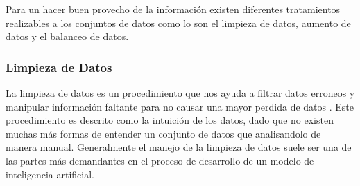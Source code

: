 \documentclass[letter,12pt]{report}
\begin{document}
Para un hacer buen provecho de la información existen diferentes tratamientos realizables
a los conjuntos de datos como lo son el limpieza de datos, aumento de datos y el balanceo
de datos.

\subsubsection{Limpieza de Datos}
La limpieza de datos es un procedimiento que nos ayuda a filtrar datos erroneos y
manipular información faltante para no causar una mayor perdida de datos \cite{Clean}.
Este procedimiento es descrito como la intuición de los datos, dado que no existen muchas
más formas de entender un conjunto de datos que analisandolo de manera manual.
Generalmente el manejo de la limpieza de datos suele ser una de las partes más
demandantes en el proceso de desarrollo de un modelo de inteligencia artificial.
\end{document}

